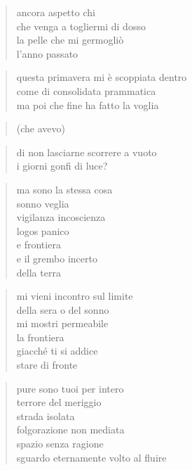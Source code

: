 \clearpage


\begin{verse}
    ancora aspetto chi\\
    che venga a togliermi di dosso\\
    la pelle che mi germogliò\\
    l'anno passato
\end{verse}

\clearpage


\begin{verse}
    questa primavera mi è scoppiata dentro\\
    come di consolidata prammatica\\
    ma poi che fine ha fatto la voglia
\end{verse}

\begin{verse}
    (che avevo)
\end{verse}

\begin{verse}
    di non lasciarne scorrere a vuoto\\
    i giorni gonfi di luce?
\end{verse}


\begin{verse}
    ma sono la stessa cosa\\
    sonno veglia\\
    vigilanza incoscienza\\
    logos panico\\
    e frontiera\\
    e il grembo incerto\\
    della terra
\end{verse}

\clearpage


\begin{verse}
    mi vieni incontro sul limite\\
    della sera o del sonno\\
    mi mostri permeabile\\
    la frontiera\\
    giacché ti si addice\\
    stare di fronte
\end{verse}

\begin{verse}
    pure sono tuoi per intero\\
    terrore del meriggio\\
    strada isolata\\
    folgorazione non mediata\\
    spazio senza ragione\\
    sguardo eternamente volto al fluire
\end{verse}

